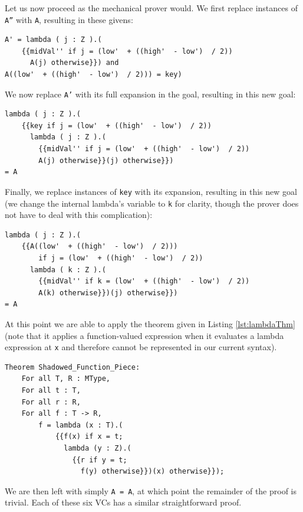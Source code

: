 

Let us now proceed as the mechanical prover would.  We first replace instances of \texttt{A''} with \texttt{A}, resulting in these givens:

\begin{verbatim}
A' = lambda ( j : Z ).(
	{{midVal'' if j = (low'  + ((high'  - low')  / 2))
	  A(j) otherwise}}) and
A((low'  + ((high'  - low')  / 2))) = key)
\end{verbatim}

We now replace \texttt{A'} with its full expansion in the goal, resulting in this new goal:

\begin{verbatim}
lambda ( j : Z ).(
	{{key if j = (low'  + ((high'  - low')  / 2))
	  lambda ( j : Z ).(
		{{midVal'' if j = (low'  + ((high'  - low')  / 2))
	  	A(j) otherwise}}(j) otherwise}})
= A
\end{verbatim}

Finally, we replace instances of \texttt{key} with its expansion, resulting in this new goal (we change the internal lambda's variable to \texttt{k} for clarity, though the prover does not have to deal with this complication):

\begin{verbatim}
lambda ( j : Z ).(
	{{A((low'  + ((high'  - low')  / 2))) 
		if j = (low'  + ((high'  - low')  / 2))
	  lambda ( k : Z ).(
		{{midVal'' if k = (low'  + ((high'  - low')  / 2))
	  	A(k) otherwise}})(j) otherwise}})
= A
\end{verbatim}

At this point we are able to apply the theorem given in Listing \ref{lst:lambdaThm} (note that it applies a function-valued expression when it evaluates a lambda expression at \texttt{x} and therefore cannot be represented in our current syntax).

\begin{lstlisting}[float=h,language=resolve,caption={A useful theorem about lambda expressions\label{lst:lambdaThm}}]
Theorem Shadowed_Function_Piece:
	For all T, R : MType,
	For all t : T,
	For all r : R,
	For all f : T -> R,
		f = lambda (x : T).(
			{{f(x) if x = t;
			  lambda (y : Z).(
				{{r if y = t;
				  f(y) otherwise}})(x) otherwise}});
\end{lstlisting}

We are then left with simply \texttt{A~=~A}, at which point the remainder of the proof is trivial.  Each of these six VCs has a similar straightforward proof.


